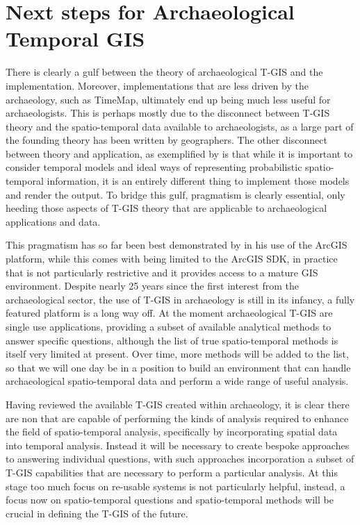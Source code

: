 \section{Next steps for Archaeological Temporal GIS}
There is clearly a gulf between the theory of archaeological T-GIS and the implementation. Moreover, implementations that are less driven by the archaeology, such as TimeMap, ultimately end up being much less useful for archaeologists. This is perhaps mostly due to the disconnect between T-GIS theory and the spatio-temporal data available to archaeologists, as a large part of the founding theory has been written by geographers. The other disconnect between theory and application, as exemplified by \citet{lock2002analysing} is that while it is important to consider temporal models and ideal ways of representing probabilistic spatio-temporal information, it is an entirely different thing to implement those models and render the output. To bridge this gulf, pragmatism is clearly essential, only heeding those aspects of T-GIS theory that are applicable to archaeological applications and data. 

This pragmatism has so far been best demonstrated by \citet{Green:2008fk} in his use of the ArcGIS platform, while this comes with being limited to the ArcGIS SDK, in practice that is not particularly restrictive and it provides access to a mature GIS environment. Despite nearly 25 years since the first interest from the archaeological sector, the use of T-GIS in archaeology is still in its infancy, a fully featured platform is a long way off. At the moment archaeological T-GIS are single use applications, providing a subset of available analytical methods to answer specific questions, although the list of true spatio-temporal methods is itself very limited at present. Over time, more methods will be added to the list, so that we will one day be in a position to build an environment that can handle archaeological spatio-temporal data and perform a wide range of useful analysis.

Having reviewed the available T-GIS created within archaeology, it is clear there are non that are capable of performing the kinds of analysis required to enhance the field of spatio-temporal analysis, specifically by incorporating spatial data into temporal analysis. Instead it will be necessary to create bespoke approaches to answering individual questions, with such approaches incorporation a subset of T-GIS capabilities that are necessary to perform a particular analysis. At this stage too much focus on re-usable systems is not particularly helpful, instead, a focus now on spatio-temporal questions and spatio-temporal methods will be crucial in defining the T-GIS of the future. 

